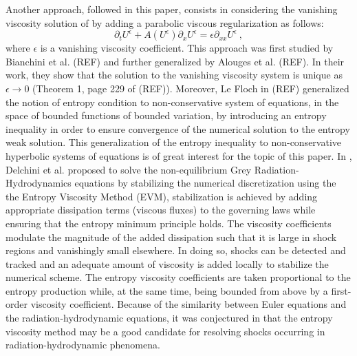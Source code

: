 \documentclass[times,doublespace]{fldauth}%
\begin{document}
Another approach, followed in this paper, consists in considering the 
vanishing viscosity solution of  by adding a parabolic viscous regularization as follows:
%
\begin{equation}
\label{eq:nc-syst-eq-visc}
\partial_t U^\epsilon + A(U^\epsilon) \partial_x U^\epsilon = \epsilon \partial_{xx} U^\epsilon \ , \nonumber
\end{equation}
%
where $\epsilon$ is a vanishing viscosity coefficient. This approach was first studied by Bianchini et al. (REF) and 
further generalized by Alouges et al. (REF). In their work, they show that the solution to the 
vanishing viscosity system is unique as $\epsilon \to 0$ (Theorem 1, page 229 of (REF)). Moreover, Le 
Floch in (REF) generalized the notion of entropy condition to non-conservative system of equations, in the space of 
bounded functions of bounded variation, by introducing an entropy inequality in order to ensure convergence of the 
numerical solution to the entropy weak solution. 
%
This generalization of the entropy inequality to non-conservative hyperbolic systems of equations is of great interest 
for the topic of this paper.
In \cite{our_jcp_radhy_paper}, Delchini et al. proposed to solve the non-equilibrium Grey Radiation-Hydrodynamics 
equations by stabilizing the numerical discretization using the the Entropy Viscosity Method (EVM), 
stabilization is achieved by adding appropriate dissipation terms (viscous fluxes) to the governing laws while ensuring 
that the entropy minimum principle holds. 
The viscosity coefficients modulate the magnitude of the added dissipation such that it is large in shock regions 
and vanishingly small elsewhere. In doing so, shocks can be detected and tracked and an adequate amount of viscosity 
is added locally to stabilize the numerical scheme. 
The entropy viscosity coefficients are taken proportional to the entropy production while, at the same time, 
being bounded from above by a first-order viscosity coefficient.
Because of the similarity between Euler equations and the radiation-hydrodynamic equations, it was conjectured in 
\cite{our_jcp_radhy_paper} that the entropy 
viscosity method may be a good candidate for resolving shocks occurring in radiation-hydrodynamic phenomena.
\end{document}
